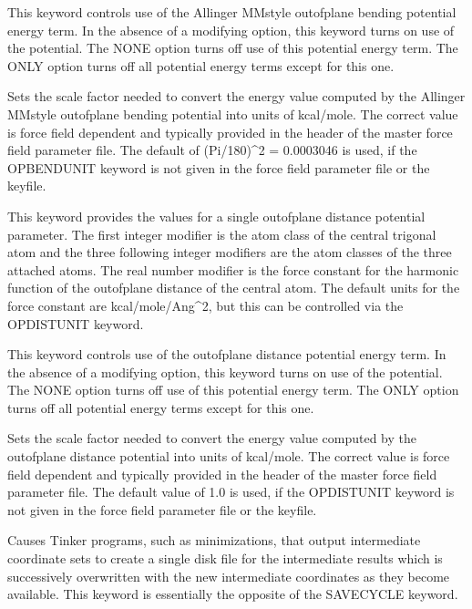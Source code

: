 \documentclass[letterpaper,11pt,english]{sphinxmanual}
\begin{document}
  This keyword controls use of the Allinger MM\sphinxhyphen{}style out\sphinxhyphen{}of\sphinxhyphen{}plane bending potential energy term. In the absence of a modifying option, this keyword turns on use of the potential. The NONE option turns off use of this potential energy term. The ONLY option turns off all potential energy terms except for this one.

  Sets the scale factor needed to convert the energy value computed by the Allinger MM\sphinxhyphen{}style out\sphinxhyphen{}of\sphinxhyphen{}plane bending potential into units of kcal/mole. The correct value is force field dependent and typically provided in the header of the master force field parameter file. The default of (Pi/180)\textasciicircum{}2 = 0.0003046 is used, if the OPBENDUNIT keyword is not given in the force field parameter file or the keyfile.

  This keyword provides the values for a single out\sphinxhyphen{}of\sphinxhyphen{}plane distance potential parameter. The first integer modifier is the atom class of the central trigonal atom and the three following integer modifiers are the atom classes of the three attached atoms. The real number modifier is the force constant for the harmonic function of the out\sphinxhyphen{}of\sphinxhyphen{}plane distance of the central atom. The default units for the force constant are kcal/mole/Ang\textasciicircum{}2, but this can be controlled via the OPDISTUNIT keyword.

  This keyword controls use of the out\sphinxhyphen{}of\sphinxhyphen{}plane distance potential energy term. In the absence of a modifying option, this keyword turns on use of the potential. The NONE option turns off use of this potential energy term. The ONLY option turns off all potential energy terms except for this one.

  Sets the scale factor needed to convert the energy value computed by the out\sphinxhyphen{}of\sphinxhyphen{}plane distance potential into units of kcal/mole. The correct value is force field dependent and typically provided in the header of the master force field parameter file. The default value of 1.0 is used, if the OPDISTUNIT keyword is not given in the force field parameter file or the keyfile.

  Causes Tinker programs, such as minimizations, that output intermediate coordinate sets to create a single disk file for the intermediate results which is successively overwritten with the new intermediate coordinates as they become available. This keyword is essentially the opposite of the SAVECYCLE keyword.
\end{document}
